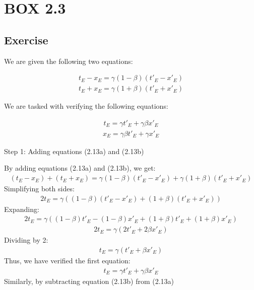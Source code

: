 \documentclass[12pt]{memoir}
\begin{document}
\section{BOX 2.3}
    \subsection{Exercise}
    We are given the following two equations:

\begin{align}
t_E - x_E = \gamma (1 - \beta)(t'_E - x'_E) 
\end{align}
\begin{align}
t_E + x_E = \gamma (1 + \beta)(t'_E + x'_E) 
\end{align}

We are tasked with verifying the following equations:

\begin{align}
t_E = \gamma t'_E + \gamma \beta x'_E
\end{align}
\begin{align}
x_E = \gamma \beta t'_E + \gamma x'_E
\end{align}

Step 1:  Adding equations (2.13a) and (2.13b)

By adding equations (2.13a) and (2.13b), we get:
\begin{align}
(t_E - x_E) + (t_E + x_E) = \gamma (1 - \beta)(t'_E - x'_E) + \gamma (1 + \beta)(t'_E + x'_E)
\end{align}
Simplifying both sides:
\begin{align}
2t_E = \gamma \left( (1 - \beta)(t'_E - x'_E) + (1 + \beta)(t'_E + x'_E) \right)
\end{align}
Expanding:
\begin{align}
2t_E = \gamma \left( (1 - \beta)t'_E - (1 - \beta)x'_E + (1 + \beta)t'_E + (1 + \beta)x'_E \right)
\end{align}
\begin{align}
2t_E = \gamma \left( 2t'_E + 2\beta x'_E \right)
\end{align}
Dividing by 2:
\begin{align}
t_E = \gamma (t'_E + \beta x'_E)
\end{align}
Thus, we have verified the first equation:
\begin{align}
t_E = \gamma t'_E + \gamma \beta x'_E
\end{align}
Similarly, by subtracting equation (2.13b) from (2.13a)
\end{document}
